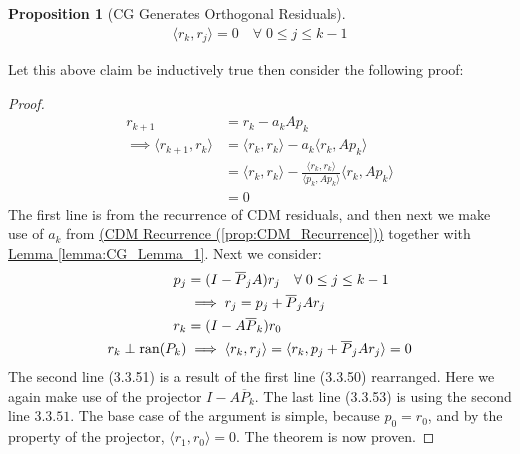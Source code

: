 \documentclass[]{article}
\theoremstyle{definition}
\newtheorem{prop}{Proposition}[section]  %
\begin{document}
            \begin{prop}[CG Generates Orthogonal Residuals]\label{prop:CG_Generates_Orthogonal_Residuals}
                \begin{align}
                    \langle r_k , r_j \rangle = 0 \quad \forall\; 0 \le j \le k - 1 
                \end{align}
            \end{prop}
            \noindent
            Let this above claim be inductively true then consider the following proof: 
            \begin{proof}
                \begin{align}
                    r_{k + 1} &= r_k - a_kAp_k
                    \\
                    \implies 
                    \langle r_{k + 1}, r_k\rangle &= \langle r_k, r_k\rangle - 
                    a_k \langle r_k, Ap_k\rangle
                    \\
                    &= \langle r_k, r_k\rangle - 
                    \frac{\langle r_k, r_k\rangle}{\langle p_k, Ap_k\rangle}
                    \langle r_k, Ap_k\rangle
                    \\
                    &= 
                    0
                \end{align}
                The first line is from the recurrence of CDM residuals, and then next we make use of $a_k$ from \hyperref[prop:CDM_Recurrence]{(CDM Recurrence (\ref*{prop:CDM_Recurrence}))} together with \hyperref[lemma:CG_Lemma_1]{Lemma \ref*{lemma:CG_Lemma_1}}. Next we consider: 
                \begin{align}
                    p_j &= (I - \overline{P}_jA)r_j \quad \forall\; 0\le j \le k - 1
                    \\
                    \hspace{1.1em} & \implies r_j = p_j + \overline{P}_jAr_j
                    \\
                    r_k &= (I - A\overline{P}_k)r_0
                    \\
                    r_k\perp \text{ran}(P_k) & \implies 
                    \langle r_k, r_j\rangle =\langle r_k, p_j + \overline{P}_jAr_j\rangle = 0
                \end{align}
                The second line (3.3.51) is a result of the first line (3.3.50) rearranged. Here we again make use of the projector $I - A \overline{P}_k$. The last line (3.3.53) is using the second line $3.3.51$. The base case of the argument is simple, because $p_0 = r_0$, and by the property of the projector, $\langle r_1, r_0\rangle = 0$. The theorem is now proven. 
            \end{proof}
\end{document}
